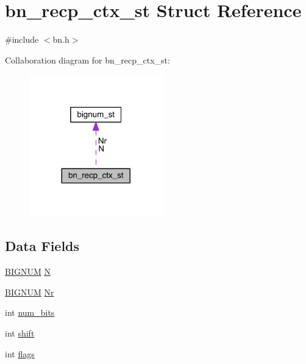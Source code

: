 \hypertarget{structbn__recp__ctx__st}{}\section{bn\+\_\+recp\+\_\+ctx\+\_\+st Struct Reference}
\label{structbn__recp__ctx__st}


{\ttfamily \#include $<$bn.\+h$>$}



Collaboration diagram for bn\+\_\+recp\+\_\+ctx\+\_\+st\+:\nopagebreak
\begin{figure}[H]
\begin{center}
\leavevmode
\includegraphics[width=164pt]{structbn__recp__ctx__st__coll__graph}
\end{center}
\end{figure}
\subsection*{Data Fields}
\begin{DoxyCompactItemize}
\item 
\hyperlink{crypto_2ossl__typ_8h_a6fb19728907ec6515e4bfb716bffa141}{B\+I\+G\+N\+UM} \hyperlink{structbn__recp__ctx__st_ad0a9b4b193ae5312d7260bedd97090b9}{N}
\item 
\hyperlink{crypto_2ossl__typ_8h_a6fb19728907ec6515e4bfb716bffa141}{B\+I\+G\+N\+UM} \hyperlink{structbn__recp__ctx__st_aa48ed99405e961fd992d716f0cd966cf}{Nr}
\item 
int \hyperlink{structbn__recp__ctx__st_a3248b66d0aee4e118d186124a596f522}{num\+\_\+bits}
\item 
int \hyperlink{structbn__recp__ctx__st_afd8d704fff636cf0234e92c1eade927c}{shift}
\item 
int \hyperlink{structbn__recp__ctx__st_ac8bf36fe0577cba66bccda3a6f7e80a4}{flags}
\end{DoxyCompactItemize}


